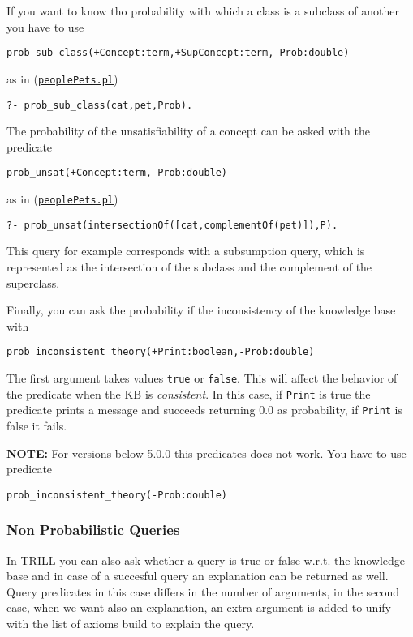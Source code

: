 If you want to know tho probability with which a class is a subclass of another you have to use
\begin{verbatim}
prob_sub_class(+Concept:term,+SupConcept:term,-Prob:double)
\end{verbatim}
as in (\href{http://trill.lamping.unife.it/example/trill/peoplePets.pl}{\texttt{peoplePets.pl}})
\begin{verbatim}
?- prob_sub_class(cat,pet,Prob).
\end{verbatim}

The probability of the unsatisfiability of a concept can be asked with the predicate
\begin{verbatim}
prob_unsat(+Concept:term,-Prob:double)
\end{verbatim}
as in (\href{http://trill.lamping.unife.it/example/trill/peoplePets.pl}{\texttt{peoplePets.pl}})
\begin{verbatim}
?- prob_unsat(intersectionOf([cat,complementOf(pet)]),P).
\end{verbatim}
This query for example corresponds with a subsumption query, which is represented as the intersection of the subclass and the complement of the superclass.

Finally, you can ask the probability if the inconsistency of the knowledge base with
\begin{verbatim}
prob_inconsistent_theory(+Print:boolean,-Prob:double)
\end{verbatim}
The first argument takes values \verb|true| or \verb|false|. This will affect the behavior of the predicate when the KB is \emph{consistent}. In this case, if \verb|Print| is true the predicate prints a message and succeeds returning 0.0 as probability, if \verb|Print| is false it fails.

\noindent
\textbf{NOTE:} For versions below 5.0.0 this predicates does not work. You have to use predicate 
\begin{verbatim}
prob_inconsistent_theory(-Prob:double)
\end{verbatim}

\subsubsection{Non Probabilistic Queries}
In TRILL you can also ask whether a query is true or false w.r.t. the knowledge base and in case of a succesful query an explanation can be returned as well. 
Query predicates in this case differs in the number of arguments, in the second case, when we want also an explanation, an extra argument is added to unify with the list of axioms
build to explain the query.

